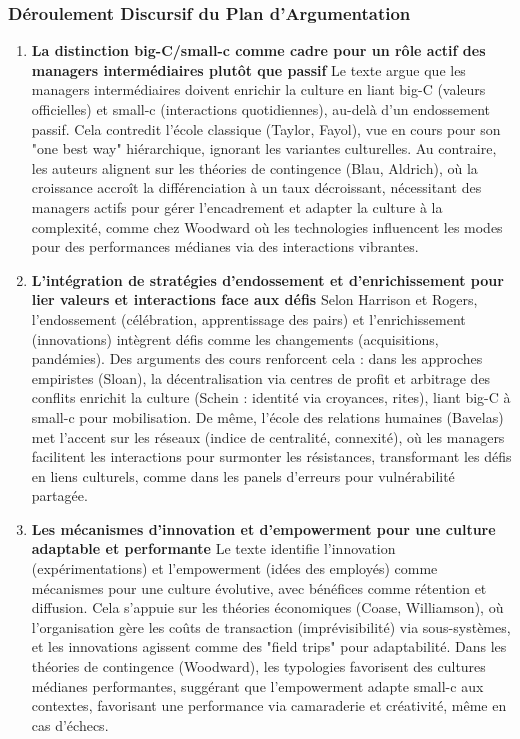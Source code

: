 \documentclass{rapportECL}
\begin{document}
\subsubsection{Déroulement Discursif du Plan d’Argumentation}
\begin{enumerate}
\item \textbf{La distinction big-C/small-c comme cadre pour un rôle actif des managers intermédiaires plutôt que passif}  
Le texte argue que les managers intermédiaires doivent enrichir la culture en liant big-C (valeurs officielles) et small-c (interactions quotidiennes), au-delà d'un endossement passif. Cela contredit l'école classique (Taylor, Fayol), vue en cours pour son "one best way" hiérarchique, ignorant les variantes culturelles. Au contraire, les auteurs alignent sur les théories de contingence (Blau, Aldrich), où la croissance accroît la différenciation à un taux décroissant, nécessitant des managers actifs pour gérer l'encadrement et adapter la culture à la complexité, comme chez Woodward où les technologies influencent les modes pour des performances médianes via des interactions vibrantes.

\item \textbf{L'intégration de stratégies d'endossement et d'enrichissement pour lier valeurs et interactions face aux défis}  
Selon Harrison et Rogers, l'endossement (célébration, apprentissage des pairs) et l'enrichissement (innovations) intègrent défis comme les changements (acquisitions, pandémies). Des arguments des cours renforcent cela : dans les approches empiristes (Sloan), la décentralisation via centres de profit et arbitrage des conflits enrichit la culture (Schein : identité via croyances, rites), liant big-C à small-c pour mobilisation. De même, l'école des relations humaines (Bavelas) met l'accent sur les réseaux (indice de centralité, connexité), où les managers facilitent les interactions pour surmonter les résistances, transformant les défis en liens culturels, comme dans les panels d'erreurs pour vulnérabilité partagée.

\item \textbf{Les mécanismes d'innovation et d'empowerment pour une culture adaptable et performante}  
Le texte identifie l'innovation (expérimentations) et l'empowerment (idées des employés) comme mécanismes pour une culture évolutive, avec bénéfices comme rétention et diffusion. Cela s'appuie sur les théories économiques (Coase, Williamson), où l'organisation gère les coûts de transaction (imprévisibilité) via sous-systèmes, et les innovations agissent comme des "field trips" pour adaptabilité. Dans les théories de contingence (Woodward), les typologies favorisent des cultures médianes performantes, suggérant que l'empowerment adapte small-c aux contextes, favorisant une performance via camaraderie et créativité, même en cas d'échecs.
\end{enumerate}
\end{document}
